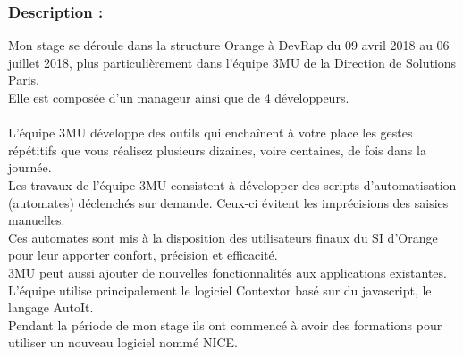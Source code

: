 \documentclass[a4paper,twoside,12pt]{report}
\begin{document}
\subsubsection{Description :}
Mon stage se déroule dans la structure Orange à DevRap du 09 avril 2018 au 06 juillet 2018, plus particulièrement dans l’équipe 3MU de la Direction de Solutions Paris.\\
Elle est composée d’un manageur ainsi que de 4 développeurs.\\\\
L’équipe 3MU développe des outils qui enchaînent à votre place les gestes répétitifs que vous réalisez plusieurs dizaines, voire centaines, de fois dans la journée.\\
Les travaux de l’équipe 3MU consistent à développer des scripts d’automatisation (automates) déclenchés sur demande. Ceux-ci évitent les imprécisions des saisies manuelles.\\
Ces automates sont mis à la disposition des utilisateurs finaux du SI d’Orange pour leur apporter confort, précision et efficacité.\\
3MU peut aussi ajouter de nouvelles fonctionnalités aux applications existantes.\\
L’équipe utilise principalement le logiciel Contextor basé sur du javascript, le langage AutoIt.\\
Pendant la période de mon stage ils ont commencé à avoir des formations pour utiliser un nouveau logiciel nommé NICE.\\
\end{document}
